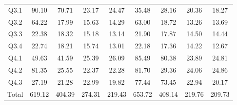 \begin{table}[]
{\begin{tabular}{@{}ccccccccc@{}}
    Q3.1                       & \multicolumn{1}{c}{90.10}     & \multicolumn{1}{c}{70.71}     & \multicolumn{1}{c}{23.17}      & 24.47      & \multicolumn{1}{c}{35.48}     & \multicolumn{1}{c}{28.16}     & \multicolumn{1}{c}{20.36}      & 18.27      \\ 
    Q3.2                       & \multicolumn{1}{c}{64.22}     & \multicolumn{1}{c}{17.99}     & \multicolumn{1}{c}{15.63}      & 14.29      & \multicolumn{1}{c}{63.00}     & \multicolumn{1}{c}{18.72}     & \multicolumn{1}{c}{13.26}      & 13.69      \\ 
    Q3.3                       & \multicolumn{1}{c}{22.38}     & \multicolumn{1}{c}{18.32}     & \multicolumn{1}{c}{15.18}      & 13.14      & \multicolumn{1}{c}{21.90}     & \multicolumn{1}{c}{17.87}     & \multicolumn{1}{c}{14.50}      & 14.44      \\ 
    Q3.4                       & \multicolumn{1}{c}{22.74}     & \multicolumn{1}{c}{18.21}     & \multicolumn{1}{c}{15.74}      & 13.01      & \multicolumn{1}{c}{22.18}     & \multicolumn{1}{c}{17.36}     & \multicolumn{1}{c}{14.22}      & 12.67      \\ 
    Q4.1                       & \multicolumn{1}{c}{49.63}     & \multicolumn{1}{c}{41.59}     & \multicolumn{1}{c}{25.39}      & 26.09      & \multicolumn{1}{c}{85.49}     & \multicolumn{1}{c}{80.38}     & \multicolumn{1}{c}{23.89}      & 24.81      \\ 
    Q4.2                       & \multicolumn{1}{c}{81.35}     & \multicolumn{1}{c}{25.55}     & \multicolumn{1}{c}{22.37}      & 22.28      & \multicolumn{1}{c}{81.70}     & \multicolumn{1}{c}{29.36}     & \multicolumn{1}{c}{24.06}      & 24.86      \\ 
    Q4.3                       & \multicolumn{1}{c}{27.19}     & \multicolumn{1}{c}{21.28}     & \multicolumn{1}{c}{22.99}      & 19.82      & \multicolumn{1}{c}{77.44}     & \multicolumn{1}{c}{73.45}     & \multicolumn{1}{c}{22.94}      & 20.17      \\ 
    Total                      & \multicolumn{1}{c}{619.12}    & \multicolumn{1}{c}{404.39}    & \multicolumn{1}{c}{274.31}     & 219.43     & \multicolumn{1}{c}{653.72}    & \multicolumn{1}{c}{408.14}    & \multicolumn{1}{c}{219.76}     & 209.73     \\ \bottomrule
    \end{tabular}%
    }
    \end{table}

